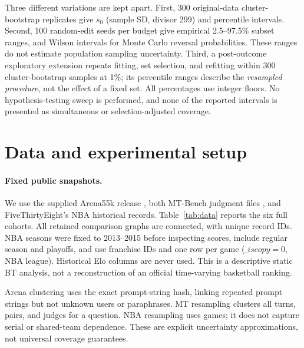 \documentclass{article}
\begin{document}
Three different variations are kept apart. First, 300 original-data cluster-bootstrap replicates give $s_0$ (sample SD, divisor 299) and percentile intervals. Second, 100 random-edit seeds per budget give empirical 2.5--97.5\% subset ranges, and Wilson intervals for Monte Carlo reversal probabilities. These ranges do not estimate population sampling uncertainty. Third, a post-outcome exploratory extension repeats fitting, set selection, and refitting within 300 cluster-bootstrap samples at 1\%; its percentile ranges describe the \emph{resampled procedure}, not the effect of a fixed set. All percentages use integer floors. No hypothesis-testing sweep is performed, and none of the reported intervals is presented as simultaneous or selection-adjusted coverage.

\section{Data and experimental setup}\label{sec:setup}
\paragraph{Fixed public snapshots.}
We use the supplied Arena55k release \citep{chiang2024arena}, both MT-Bench judgment files \citep{zheng2023judging}, and FiveThirtyEight's NBA historical records. Table~\ref{tab:data} reports the six full cohorts. All retained comparison graphs are connected, with unique record IDs. NBA seasons were fixed to 2013--2015 before inspecting scores, include regular season and playoffs, and use franchise IDs and one row per game ($\_iscopy=0$, NBA league). Historical Elo columns are never used. This is a descriptive static BT analysis, not a reconstruction of an official time-varying basketball ranking.

\begin{table}[t]
\centering\small
\caption{Full cohorts and original fixed top-pair margins. Intervals are 95\% cluster-bootstrap percentile intervals with 300 replicates. $P$: entrants. Ties include GPT-4's inconsistent judgments under the main convention. MT full releases are not a matched panel.}\label{tab:data}


\end{table}

Arena clustering uses the exact prompt-string hash, linking repeated prompt strings but not unknown users or paraphrases. MT resampling clusters all turns, pairs, and judges for a question. NBA resampling uses games; it does not capture serial or shared-team dependence. These are explicit uncertainty approximations, not universal coverage guarantees.
\end{document}
